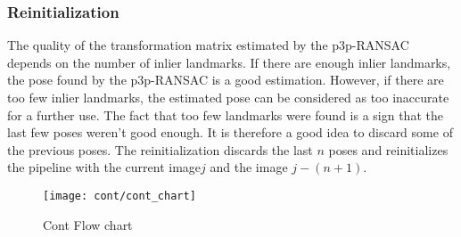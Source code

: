 \subsubsection{Reinitialization}
The quality of the transformation matrix estimated by the p3p-RANSAC depends on the number of inlier landmarks. If there are enough inlier landmarks, the pose found by the p3p-RANSAC is a good estimation. However, if there are too few inlier landmarks, the estimated pose can be considered as too inaccurate for a further use. The fact that too few landmarks were found is a sign that the last few poses weren't good enough. It is therefore a good idea to discard some of the previous poses. The reinitialization discards the last \begin{math} n \end{math} poses and reinitializes the pipeline with the current image\begin{math} j \end{math} and the image \begin{math} j-(n+1) \end{math}. 

\begin{figure}[ht]
	\centering
	\texttt{[image: cont/cont\_chart]}
	\caption{Cont Flow chart}
	\label{img_flow_cont}
\end{figure}